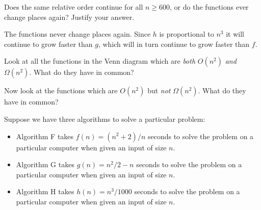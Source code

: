 \documentclass{tufte-handout}
\begin{document}
\begin{questions}
\item Does the same relative order continue for all $n \geq 600$, or do
  the functions ever change places again?  Justify your answer.
  \begin{answer}The functions never change places again.  Since $h$
    is proportional to $n^3$ it will continue to grow faster than
    $g$, which will in turn continue to grow faster than
    $f$.\end{answer}

\item Look at all the functions in the Venn diagram which are
  \emph{both} $O(n^2)$ \emph{and} $\Omega(n^2)$.  What do they have in
  common?

\item Now look at the functions which are $O(n^2)$ but \emph{not}
  $\Omega(n^2)$.  What do they have in common?


\item Suppose we have three algorithms to solve a particular problem:
  \begin{itemize}
  \item Algorithm F takes $f(n) = (n^2 + 2)/n$ seconds to solve
    the problem on a particular computer when given an input of size $n$.
  \item Algorithm G takes $g(n) = n^2/2 - n$ seconds to solve
    the problem on a particular computer when given an input of size $n$.
  \item Algorithm H takes $h(n) = n^3/1000$ seconds to solve
    the problem on a particular computer when given an input of size $n$.
  \end{itemize}


\end{questions}
\end{document}
